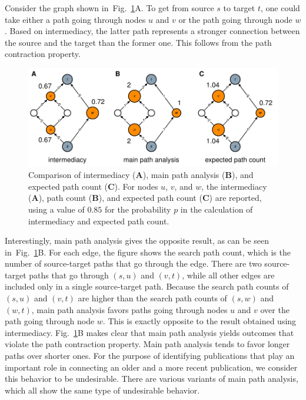 \documentclass[9pt,twocolumn,twoside]{pnas-alt} %
\theoremstyle{definition}
\newcommand{\subfigref}[2]{Fig.~\ref{fig:#1}#2\xspace}
\begin{document}
Consider the graph shown in~\subfigref{comparison}{A}. To get from source $s$ to target $t$, one could take either a path going through nodes $u$ and $v$ or the path going through node $w$. Based on intermediacy, the latter path represents a stronger connection between the source and the target than the former one. This follows from the path contraction property.

\begin{sansmath}\begin{figure}[b]
  \centering%
  \includegraphics[width=\linewidth]{comparison}
  \caption{Comparison of intermediacy (\textbf{A}), main path analysis (\textbf{B}), and expected path count (\textbf{C}). For nodes $u$, $v$, and $w$, the intermediacy (\textbf{A}), path count (\textbf{B}), and expected path count (\textbf{C}) are reported, using a value of $0.85$ for the probability $p$ in the calculation of intermediacy and expected path count.}
  \label{fig:comparison}
\end{figure}\end{sansmath}

Interestingly, main path analysis gives the opposite result, as can be seen in~\subfigref{comparison}{B}. For each edge, the figure shows the search path count, which is the number of source-target paths that go through the edge. There are two source-target paths that go through $(s, u)$ and $(v, t)$, while all other edges are included only in a single source-target path. Because the search path counts of $(s, u)$ and $(v, t)$ are higher than the search path counts of $(s, w)$ and $(w, t)$, main path analysis favors paths going through nodes $u$ and $v$ over the path going through node $w$. This is exactly opposite to the result obtained using intermediacy. \subfigref{comparison}{B} makes clear that main path analysis yields outcomes that violate the path contraction property. Main path analysis tends to favor longer paths over shorter ones. For the purpose of identifying publications that play an important role in connecting an older and a more recent publication, we consider this behavior to be undesirable. There are various variants of main path analysis, which all show the same type of undesirable behavior.
\end{document}
